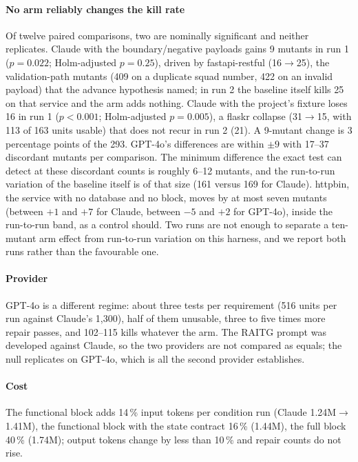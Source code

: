 \documentclass[preprint,12pt]{elsarticle}
\begin{document}
\paragraph{No arm reliably changes the kill rate} Of twelve paired comparisons, two are nominally significant and neither replicates. Claude with the boundary/negative payloads gains 9 mutants in run 1 ($p=0.022$; Holm-adjusted $p=0.25$), driven by fastapi-restful (16$\to$25), the validation-path mutants (409 on a duplicate squad number, 422 on an invalid payload) that the advance hypothesis named; in run 2 the baseline itself kills 25 on that service and the arm adds nothing. Claude with the project's fixture loses 16 in run 1 ($p<0.001$; Holm-adjusted $p=0.005$), a flaskr collapse (31$\to$15, with 113 of 163 units usable) that does not recur in run 2 (21). A 9-mutant change is 3 percentage points of the 293. GPT-4o's differences are within $\pm 9$ with 17--37 discordant mutants per comparison. The minimum difference the exact test can detect at these discordant counts is roughly 6--12 mutants, and the run-to-run variation of the baseline itself is of that size (161 versus 169 for Claude). httpbin, the service with no database and no block, moves by at most seven mutants (between $+1$ and $+7$ for Claude, between $-5$ and $+2$ for GPT-4o), inside the run-to-run band, as a control should. Two runs are not enough to separate a ten-mutant arm effect from run-to-run variation on this harness, and we report both runs rather than the favourable one.

\paragraph{Provider} GPT-4o is a different regime: about three tests per requirement (516 units per run against Claude's 1,300), half of them unusable, three to five times more repair passes, and 102--115 kills whatever the arm. The RAITG prompt was developed against Claude, so the two providers are not compared as equals; the null replicates on GPT-4o, which is all the second provider establishes.

\paragraph{Cost} The functional block adds 14\,\% input tokens per condition run (Claude 1.24M$\to$1.41M), the functional block with the state contract 16\,\% (1.44M), the full block 40\,\% (1.74M); output tokens change by less than 10\,\% and repair counts do not rise.
\end{document}
